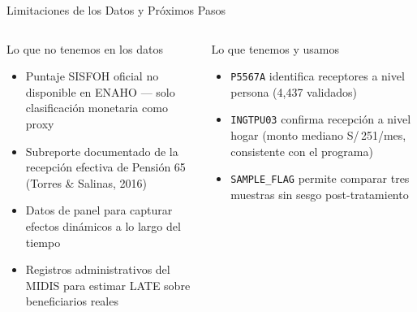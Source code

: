 \documentclass[aspectratio=169, 10pt]{beamer}
\begin{document}
\begin{frame}{Limitaciones de los Datos y Próximos Pasos}
  \begin{columns}[T]
      \begin{block}{Lo que no tenemos en los datos}
        \footnotesize
        \begin{itemize}
          \setlength\itemsep{4pt}
          \item Puntaje SISFOH oficial no disponible en ENAHO —
                solo clasificación monetaria como proxy
          \item Subreporte documentado de la recepción efectiva
                de Pensión 65 (Torres \& Salinas, 2016)
          \item Datos de panel para capturar efectos dinámicos
                a lo largo del tiempo
          \item Registros administrativos del MIDIS para estimar
                LATE sobre beneficiarios reales
        \end{itemize}
      \end{block}

      \vspace{6pt}
      \begin{block}{Lo que tenemos y usamos}
        \footnotesize
        \begin{itemize}
          \setlength\itemsep{4pt}
          \item \texttt{P5567A} identifica receptores a nivel persona
                (4{,}437 validados)
          \item \texttt{INGTPU03} confirma recepción a nivel hogar
                (monto mediano S/\,251/mes, consistente con el programa)
          \item \texttt{SAMPLE\_FLAG} permite comparar tres muestras
                sin sesgo post-tratamiento
        \end{itemize}
      \end{block}


\end{columns}
\end{frame}
\end{document}
